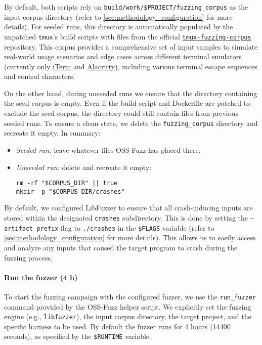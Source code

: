 \documentclass[11pt,a4paper,twocolumn]{article}
\begin{document}
By default, both scripts rely on \texttt{build/work/\$PROJECT/fuzzing\_corpus} as the input corpus directory (refer to \autoref{sec:methodology_configuration} for more details). For seeded runs, this directory is automatically populated by the unpatched \texttt{tmux}'s build scripts with files from the official \href{https://github.com/tmux/tmux-fuzzing-corpus/}{\texttt{tmux-fuzzing-corpus}} repository. This corpus provides a comprehensive set of input samples to simulate real-world usage scenarios and edge cases across different terminal emulators (currently only \href{https://iterm2.com/}{iTerm} and \href{https://alacritty.org/}{Alacritty}), including various terminal escape sequences and control characters. \cite{tmux:tmux-fuzzing-corpus}

On the other hand, during unseeded runs we ensure that the directory containing the seed corpus is empty. Even if the build script and Dockerfile are patched to exclude the seed corpus, the directory could still contain files from previous seeded runs. To ensure a clean state, we delete the \texttt{fuzzing\_corpus} directory and recreate it empty. In summary:

\begin{itemize}
	\item \emph{Seeded run:} leave whatever files OSS-Fuzz has placed there.
	\item \emph{Unseeded run:} delete and recreate it empty:
	      \begin{verbatim}
rm -rf "$CORPUS_DIR" || true
mkdir -p "$CORPUS_DIR/crashes"
\end{verbatim}
\end{itemize}

By default, we configured LibFuzzer to ensure that all crash-inducing inputs are stored within the designated \texttt{crashes} subdirectory. This is done by setting the \texttt{---artifact\_prefix} flag to \texttt{./crashes} in the \texttt{\$FLAGS} variable (refer to \autoref{sec:methodology_configuration} for more details). This allows us to easily access and analyze any inputs that caused the target program to crash during the fuzzing process.

\noindent \paragraph{Run the fuzzer (4 h)}

To start the fuzzing campaign with the configured fuzzer, we use the \texttt{run\_fuzzer} command provided by the OSS-Fuzz helper script. We explicitly set the fuzzing engine (e.g., \texttt{libfuzzer}), the input corpus directory, the target project, and the specific harness to be used. By default the fuzzer runs for 4 hours (14400 seconds), as specified by the \texttt{\$RUNTIME} variable.
\end{document}
